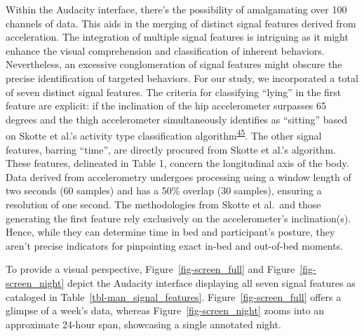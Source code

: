 \documentclass[
  9pt,
]{article}
\begin{document}
Within the Audacity interface, there's the possibility of amalgamating
over 100 channels of data. This aids in the merging of distinct signal
features derived from acceleration. The integration of multiple signal
features is intriguing as it might enhance the visual comprehension and
classification of inherent behaviors. Nevertheless, an excessive
conglomeration of signal features might obscure the precise
identification of targeted behaviors. For our study, we incorporated a
total of seven distinct signal features. The criteria for classifying
``lying'' in the first feature are explicit: if the inclination of the
hip accelerometer surpasses 65 degrees and the thigh accelerometer
simultaneously identifies as ``sitting'' based on Skotte et al.'s
activity type classification
algorithm\textsuperscript{\protect\hyperlink{ref-skotte_detection_2014}{45}}.
The other signal features, barring ``time'', are directly procured from
Skotte et al.'s algorithm. These features, delineated in Table 1,
concern the longitudinal axis of the body. Data derived from
accelerometry undergoes processing using a window length of two seconds
(60 samples) and has a 50\% overlap (30 samples), ensuring a resolution
of one second. The methodologies from Skotte et al.~and those generating
the first feature rely exclusively on the accelerometer's
inclination(s). Hence, while they can determine time in bed and
participant's posture, they aren't precise indicators for pinpointing
exact in-bed and out-of-bed moments.

To provide a visual perspective, Figure~\ref{fig-screen_full} and
Figure~\ref{fig-screen_night} depict the Audacity interface displaying
all seven signal features as cataloged in
Table~\ref{tbl-man_signal_features}. Figure~\ref{fig-screen_full} offers
a glimpse of a week's data, whereas Figure~\ref{fig-screen_night} zooms
into an approximate 24-hour span, showcasing a single annotated night.

\newpage

\begingroup

\footnotesize
\end{document}
